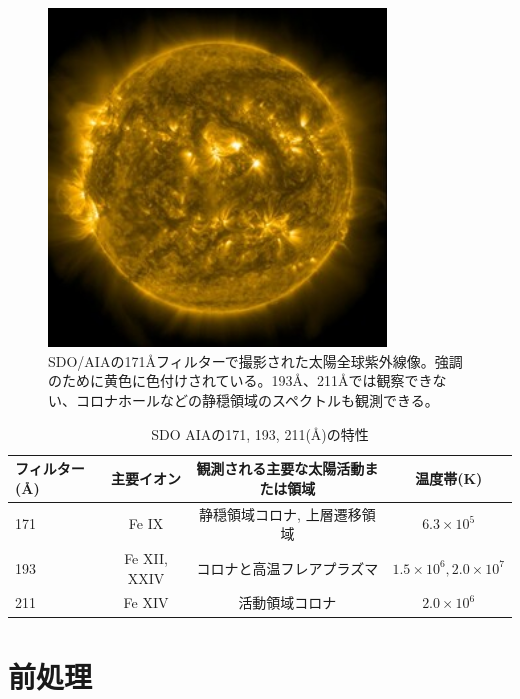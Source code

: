     \begin{figure}[h]
        \centering
        \includegraphics[width=0.8\textwidth]{figures/data/latest_256_0171.jpg}
        \caption{SDO/AIAの171Åフィルターで撮影された太陽全球紫外線像。強調のために黄色に色付けされている。193Å、211Åでは観察できない、コロナホールなどの静穏領域のスペクトルも観測できる。}
        \label{fig:sample_aia171}
    \end{figure}

\begin{table}[hptb]
    \centering
    \caption{SDO AIAの171, 193, 211(\AA)の特性}
    \begin{tabular}{lccc}
    \hline
    \textbf{フィルター (\AA)} & \textbf{主要イオン} & \textbf{観測される主要な太陽活動または領域} & \textbf{温度帯(K)}  \\ \hline
    171 & Fe IX & 静穏領域コロナ, 上層遷移領域 & \(6.3 \times 10^{5} \) \\ \hline
    193 & Fe XII, XXIV & コロナと高温フレアプラズマ & \(1.5 \times 10^6, 2.0 \times 10^7 \)  \\ \hline
    211 & Fe XIV & 活動領域コロナ & \(2.0 \times 10^6\) \\ \hline
    \end{tabular}
    \label{table:aia_filters_details}
\end{table}


\section{前処理}

